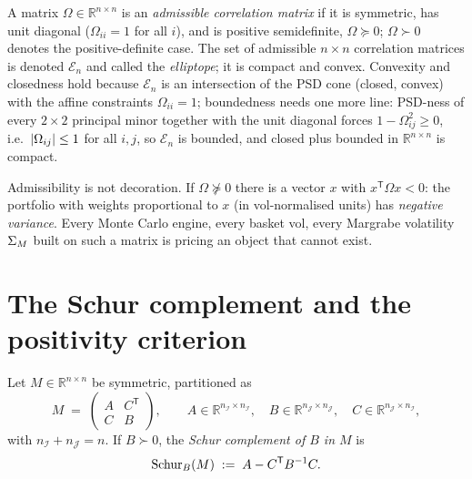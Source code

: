 \begin{definition}\label{def:admiss:corr}
A matrix $\Omega \in \mathbb{R}^{n \times n}$ is an \emph{admissible
correlation matrix} if it is symmetric, has unit diagonal
($\Omega_{ii} = 1$ for all $i$), and is positive semidefinite,
$\Omega \succeq 0$; $\Omega \succ 0$ denotes the positive-definite case.
The set of admissible $n \times n$ correlation matrices is denoted
$\mathcal{E}_n$ and called the \emph{elliptope}; it is compact and convex.
Convexity and closedness hold because $\mathcal{E}_n$ is an intersection of
the PSD cone (closed, convex) with the affine constraints $\Omega_{ii} = 1$;
boundedness needs one more line: PSD-ness of every $2 \times 2$ principal
minor together with the unit diagonal forces
$1 - \Omega_{ij}^2 \ge 0$, i.e.\ $\lvert\Omega_{ij}\rvert \le 1$ for all $i, j$,
so $\mathcal{E}_n$ is bounded, and closed plus bounded in
$\mathbb{R}^{n \times n}$ is compact.
\end{definition}

Admissibility is not decoration. If $\Omega \not\succeq 0$ there is a vector
$x$ with $x^{\mathsf T} \Omega x < 0$: the portfolio with weights
proportional to $x$ (in vol-normalised units) has \emph{negative variance}.
Every Monte Carlo engine, every basket vol, every Margrabe volatility
$\Sigma_M$ built on such a matrix is pricing an object that cannot exist.

\section{The Schur complement and the positivity criterion}
\label{sec:admiss:schur}

\begin{definition}\label{def:admiss:schurcomp}
Let $M \in \mathbb{R}^{n \times n}$ be symmetric, partitioned as
\begin{equation}\label{eq:admiss:block}
  M \;=\; \begin{pmatrix} A & C^{\mathsf T} \\ C & B \end{pmatrix},
  \qquad
  A \in \mathbb{R}^{n_{\mathcal I} \times n_{\mathcal I}},\quad
  B \in \mathbb{R}^{n_{\mathcal J} \times n_{\mathcal J}},\quad
  C \in \mathbb{R}^{n_{\mathcal J} \times n_{\mathcal I}},
\end{equation}
with $n_{\mathcal I} + n_{\mathcal J} = n$. If $B \succ 0$, the
\emph{Schur complement of $B$ in $M$} is
\begin{equation}\label{eq:admiss:schurdef}
  \mathrm{Schur}_{B}\!\left(M\right) \;:=\; A - C^{\mathsf T} B^{-1} C .
\end{equation}
\end{definition}

